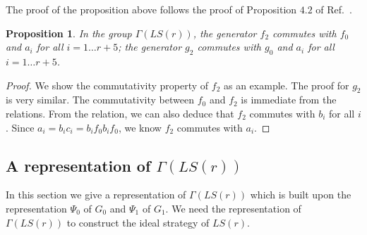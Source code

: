 \documentclass[11pt,letterpaper]{article}
\newcommand{\1}{\mathbb{1}}
\newcommand{\LS}{LS}
\newtheorem{proposition}[theorem]{Proposition}
\theoremstyle{definition}
\begin{document}
The proof of the proposition above follows the proof of Proposition $4.2$ of Ref.~\cite{slofstra2017}.
\begin{proposition}
	In the group $\Gamma(\LS(r))$, the generator $f_2$ commutes with $f_0$ and $a_i$ for all $i = 1 \dots r+5$;
	the generator $g_2$ commutes with $g_0$ and $a_i$ for all $i = 1 \dots r+5$.
\end{proposition}
\begin{proof}
	We show the commutativity property of $f_2$ as an example. The proof for $g_2$ is very similar.
	The commutativity between $f_0$ and $f_2$ is immediate from the relations.
	From the relation, we can also deduce that $f_2$ commutes with $b_i$ for all $i$.
	Since $a_i =b_ic_i = b_i f_0 b_i f_0$, we know $f_2$ commutes with $a_i$.
\end{proof}

\subsection{A representation of $\Gamma(\LS(r))$}
In this section we give a representation of $\Gamma(\LS(r))$ which is built upon the representation 
$\Psi_0$ of $G_0$ and $\Psi_1$ of $G_1$. We need the representation of $\Gamma(\LS(r))$ to construct the
ideal strategy of $\LS(r)$.
\end{document}
